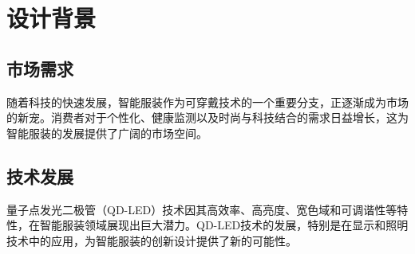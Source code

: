 \documentclass[12pt,hyperref,a4paper,UTF8]{ctexart}
\begin{document}
\cover

\newpage
\begin{abstract}

随着可穿戴技术的快速发展，智能服装作为其重要分支，正逐渐成为市场的新宠。本项目旨在设计一款集成量子点发光二极管（QD-LED）技术的智能服饰，利用QD-LED的高效率发光和多种颜色发光的优势，结合柔性材料和多样化的制造工艺，实现服饰的智能化和个性化。通过深入研究和创新设计，我们实现了一款具有高效能、个性化和智能化特点的智能服装。

在设计过程中，我们面临了柔性与耐用性、功耗与续航、环境适应性以及智能控制等挑战。通过选择高性能的柔性材料、优化电路设计、采用防水防尘的封装材料以及集成先进的传感器和控制系统，我们确保了智能服装的高性能和稳定性。此外，我们还考虑了产品的环保性、成本效益、市场定位以及法规遵从性，确保产品在满足市场需求的同时，也具有社会和环境的可持续性。

最终，我们的智能服装在发光效率、颜色多样性、柔性材料集成、工艺多样性、场景适应性等方面均达到了设计目标。产品在舒适性、耐用性、智能化和美观性上均表现出色，满足了市场的期望。通过本项目，我们展示了智能服装在技术、市场和环境可持续性方面的全面优势，为智能服饰领域的发展提供了坚实的基础。
\end{abstract}


\thispagestyle{empty} %
\newpage
\newpage
\tableofcontents

\newpage



\section{设计背景}
\subsection*{市场需求}
随着科技的快速发展，智能服装作为可穿戴技术的一个重要分支，正逐渐成为市场的新宠。消费者对于个性化、健康监测以及时尚与科技结合的需求日益增长，这为智能服装的发展提供了广阔的市场空间。

\subsection*{技术发展}
量子点发光二极管（QD-LED）技术因其高效率、高亮度、宽色域和可调谐性等特性，在智能服装领域展现出巨大潜力。QD-LED技术的发展，特别是在显示和照明技术中的应用，为智能服装的创新设计提供了新的可能性。
\end{document}
